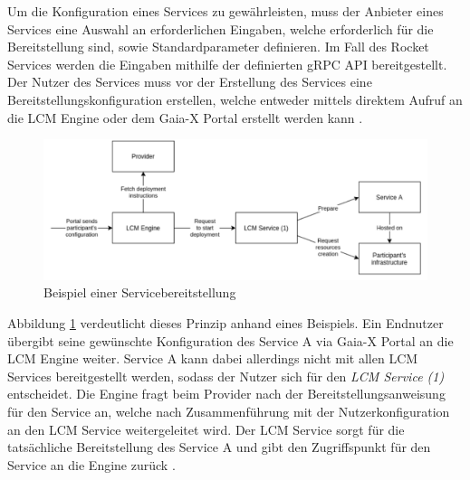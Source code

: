 Um die Konfiguration eines Services zu gewährleisten, muss der Anbieter eines Services eine Auswahl
an erforderlichen Eingaben, welche erforderlich für die Bereitstellung sind, sowie Standardparameter definieren.
Im Fall des Rocket Services werden die Eingaben mithilfe der definierten gRPC API bereitgestellt.
Der Nutzer des Services muss vor der Erstellung des Services eine Bereitstellungskonfiguration erstellen,
welche entweder mittels direktem Aufruf an die \ac{LCM} Engine oder dem Gaia-X Portal erstellt werden kann \cite{ORC2021}.

\begin{figure}[h]
  \centering
  \includegraphics[width=\textwidth]{gfx/chapters/4_gaia-X/example_deployment.png}
  \caption{Beispiel einer Servicebereitstellung}
  \label{fig:gaia-x-example_deployment}
\end{figure}
Abbildung \ref{fig:gaia-x-example_deployment} verdeutlicht dieses Prinzip anhand eines Beispiels.
Ein Endnutzer übergibt seine gewünschte Konfiguration des Service A via Gaia-X Portal an die \ac{LCM} Engine weiter.
Service A kann dabei allerdings nicht mit allen LCM Services bereitgestellt werden,
sodass der Nutzer sich für den \emph{\ac{LCM} Service (1)} entscheidet.
Die Engine fragt beim Provider nach der Bereitstellungsanweisung für den Service an, 
welche nach Zusammenführung mit der Nutzerkonfiguration an den \ac{LCM} Service weitergeleitet wird.
Der \ac{LCM} Service sorgt für die tatsächliche Bereitstellung des Service A 
und gibt den Zugriffspunkt für den Service an die Engine zurück \cite{ORC2021}.
